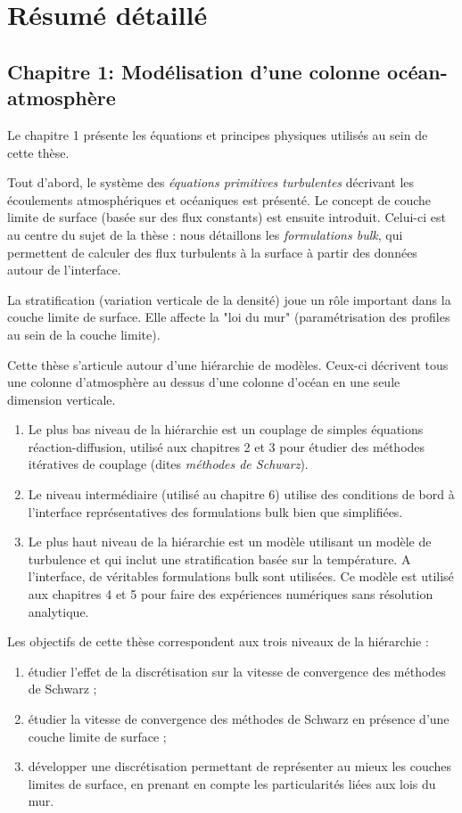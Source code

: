 \chapter*{Résumé détaillé}
\section*{Chapitre 1: Modélisation d'une colonne océan-atmosphère}
Le chapitre 1 présente les équations et principes physiques utilisés
au sein de cette thèse.
\par
Tout d'abord, le système des \textit{équations primitives turbulentes}
décrivant les écoulements atmosphériques et océaniques est présenté.
Le concept de couche limite de surface
(basée sur des flux constants) est ensuite introduit.
Celui-ci est au centre du sujet de la thèse : nous détaillons les
\textit{formulations bulk}, qui permettent de calculer des flux
turbulents à la surface à partir des données autour de l'interface.
\par
La stratification (variation verticale de la densité) joue un rôle
important dans la couche limite de surface. Elle affecte la
"loi du mur" (paramétrisation des profiles au sein de la couche
limite).
\par
Cette thèse s'articule autour d'une hiérarchie de modèles. Ceux-ci
décrivent tous une colonne d'atmosphère au dessus d'une colonne
d'océan en une seule dimension verticale.
\par
\begin{enumerate}
	\item Le plus bas niveau de la hiérarchie est un couplage
	de simples équations réaction-diffusion, utilisé aux chapitres
		2 et 3 pour étudier des méthodes itératives de
		couplage (dites \textit{méthodes de Schwarz}).
	\item Le niveau intermédiaire (utilisé au chapitre 6)
		utilise des conditions de bord
	à l'interface représentatives des formulations bulk bien
		que simplifiées.
\item Le plus haut niveau de la hiérarchie est un modèle utilisant
un modèle de turbulence et qui inclut une stratification basée sur
la température. A l'interface, de véritables formulations bulk
sont utilisées. Ce modèle est utilisé aux chapitres 4 et 5 pour
faire des expériences numériques sans résolution analytique.
\end{enumerate}
Les objectifs de cette thèse correspondent aux trois niveaux de la
hiérarchie :
\begin{enumerate}
	\item étudier l'effet de la discrétisation sur la vitesse de
		convergence des méthodes de Schwarz ;
	\item étudier la vitesse de convergence des méthodes de
		Schwarz en présence d'une couche limite de surface ;
	\item développer une discrétisation permettant de représenter
		au mieux les couches limites de surface, en prenant
		en compte les particularités liées aux lois du mur.
\end{enumerate}
